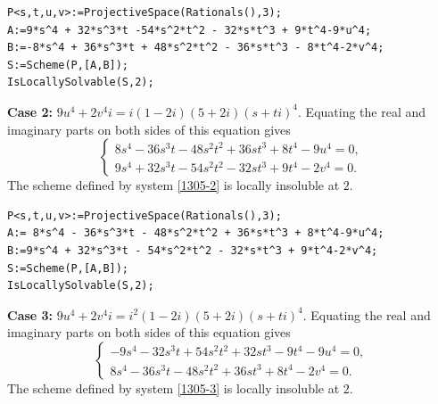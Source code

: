 \documentclass[a4paper,12pt,english,reqno]{amsart}
\begin{document}
\begin{lstlisting}
P<s,t,u,v>:=ProjectiveSpace(Rationals(),3);
A:=9*s^4 + 32*s^3*t -54*s^2*t^2 - 32*s*t^3 + 9*t^4-9*u^4;
B:=-8*s^4 + 36*s^3*t + 48*s^2*t^2 - 36*s*t^3 - 8*t^4-2*v^4;
S:=Scheme(P,[A,B]);
IsLocallySolvable(S,2);
\end{lstlisting}
{\bf Case 2:} $9u^4+2v^4i=i(1-2i)(5+2i)(s+ti)^4$. Equating the real and imaginary parts on both sides of this equation gives
\begin{equation}\label{1305-2}
\begin{cases}
8s^4 - 36s^3t - 48s^2t^2 + 36st^3 + 8t^4-9u^4=0,\\
9s^4 + 32s^3t - 54s^2t^2 - 32st^3 + 9t^4-2v^4=0.
\end{cases}
\end{equation}
The scheme defined by system \eqref{1305-2} is locally insoluble at $2$.

\begin{lstlisting}
P<s,t,u,v>:=ProjectiveSpace(Rationals(),3);
A:= 8*s^4 - 36*s^3*t - 48*s^2*t^2 + 36*s*t^3 + 8*t^4-9*u^4;
B:=9*s^4 + 32*s^3*t - 54*s^2*t^2 - 32*s*t^3 + 9*t^4-2*v^4;
S:=Scheme(P,[A,B]);
IsLocallySolvable(S,2);
\end{lstlisting}


{\bf Case 3:} $9u^4+2v^4i=i^2(1-2i)(5+2i)(s+ti)^4$. Equating the real and imaginary parts on both sides of this equation gives
\begin{equation}\label{1305-3}
\begin{cases}
-9s^4 - 32s^3t + 54s^2t^2 + 32st^3 - 9t^4 - 9u^4=0,\\
8s^4 - 36s^3t - 48s^2t^2 + 36st^3 + 8t^4 - 2v^4=0.
\end{cases}
\end{equation}
The scheme defined by system \eqref{1305-3} is locally insoluble at $2$.


\end{document}

